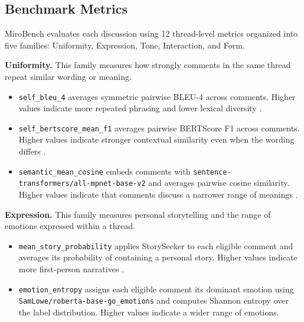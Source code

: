
\subsection{Benchmark Metrics}
\label{sec:scores}

MiroBench evaluates each discussion using 12 thread-level metrics organized
into five families: Uniformity, Expression, Tone, Interaction, and Form.

\textbf{Uniformity.}
This family measures how strongly comments in the same thread repeat similar
wording or meaning.
\begin{itemize}
    \item \texttt{self\_bleu\_4} averages symmetric pairwise BLEU-4 across
    comments. Higher values indicate more repeated phrasing and lower lexical
    diversity \citep{zhu2018texygen}.

    \item \texttt{self\_bertscore\_mean\_f1} averages pairwise BERTScore F1
    across comments. Higher values indicate stronger contextual similarity
    even when the wording differs \citep{zhang2019bertscore,zhang2024improving}.

    \item \texttt{semantic\_mean\_cosine} embeds comments with
    \texttt{sentence-transformers/all-mpnet-base-v2} and averages pairwise
    cosine similarity. Higher values indicate that comments discuss a narrower
    range of meanings \citep{reimers2019sentence,song2020mpnet}.
\end{itemize}

\textbf{Expression.}
This family measures personal storytelling and the range of emotions expressed
within a thread.
\begin{itemize}
    \item \texttt{mean\_story\_probability} applies StorySeeker to each
    eligible comment and averages its probability of containing a personal
    story. Higher values indicate more first-person narratives
    \citep{antoniak2024people}.

    \item \texttt{emotion\_entropy} assigns each eligible comment its dominant
    emotion using \texttt{SamLowe/roberta-base-go\_emotions} and computes
    Shannon entropy over the label distribution. Higher values indicate a
    wider range of emotions.
\end{itemize}

